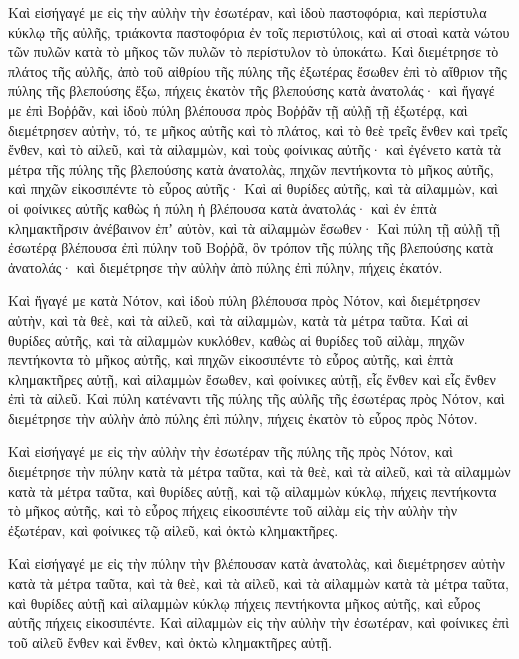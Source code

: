 {\par }{\PP {}Καὶ εἰσήγαγέ με εἰς τὴν αὐλὴν τὴν ἐσωτέραν, καὶ ἰδοὺ παστοφόρια, καὶ περίστυλα κύκλῳ τῆς αὐλῆς, τριάκοντα παστοφόρια ἐν τοῖς περιστύλοις,
καὶ αἱ στοαὶ κατὰ νώτου τῶν πυλῶν κατὰ τὸ μῆκος τῶν πυλῶν τὸ περίστυλον τὸ ὑποκάτω.
Καὶ διεμέτρησε τὸ πλάτος τῆς αὐλῆς, ἀπὸ τοῦ αἰθρίου τῆς πύλης τῆς ἐξωτέρας ἔσωθεν ἐπὶ τὸ αἴθριον τῆς πύλης τῆς βλεπούσης ἔξω, πήχεις ἑκατὸν τῆς βλεπούσης κατὰ ἀνατολάς· καὶ ἤγαγέ με ἐπὶ Βοῤῥᾶν,
καὶ ἰδοὺ πύλη βλέπουσα πρὸς Βοῤῥᾶν τῇ αὐλῇ τῇ ἐξωτέρᾳ, καὶ διεμέτρησεν αὐτὴν, τό, τε μῆκος αὐτῆς καὶ τὸ πλάτος,
καὶ τὸ θεὲ τρεῖς ἔνθεν καὶ τρεῖς ἔνθεν, καὶ τὸ αἰλεῦ, καὶ τὰ αἰλαμμὼν, καὶ τοὺς φοίνικας αὐτῆς· καὶ ἐγένετο κατὰ τὰ μέτρα τῆς πύλης τῆς βλεπούσης κατὰ ἀνατολὰς, πηχῶν πεντήκοντα τὸ μῆκος αὐτῆς, καὶ πηχῶν εἰκοσιπέντε τὸ εὖρος αὐτῆς·
Καὶ αἱ θυρίδες αὐτῆς, καὶ τὰ αἰλαμμὼν, καὶ οἱ φοίνικες αὐτῆς καθὼς ἡ πύλη ἡ βλέπουσα κατὰ ἀνατολάς· καὶ ἐν ἑπτὰ κλημακτῆρσιν ἀνέβαινον ἐπʼ αὐτὸν, καὶ τὰ αἰλαμμὼν ἔσωθεν·
Καὶ πύλη τῇ αὐλῇ τῇ ἐσωτέρᾳ βλέπουσα ἐπὶ πύλην τοῦ Βοῤῥᾶ, ὃν τρόπον τῆς πύλης τῆς βλεπούσης κατὰ ἀνατολάς· καὶ διεμέτρησε τὴν αὐλὴν ἀπὸ πύλης ἐπὶ πύλην, πήχεις ἑκατόν.
\par }{\PP {}Καὶ ἤγαγέ με κατὰ Νότον, καὶ ἰδοὺ πύλη βλέπουσα πρὸς Νότον, καὶ διεμέτρησεν αὐτὴν, καὶ τὰ θεὲ, καὶ τὰ αἰλεῦ, καὶ τὰ αἰλαμμὼν, κατὰ τὰ μέτρα ταῦτα.
Καὶ αἱ θυρίδες αὐτῆς, καὶ τὰ αἰλαμμὼν κυκλόθεν, καθὼς αἱ θυρίδες τοῦ αἰλὰμ, πηχῶν πεντήκοντα τὸ μῆκος αὐτῆς, καὶ πηχῶν εἰκοσιπέντε τὸ εὖρος αὐτῆς,
καὶ ἑπτὰ κλημακτῆρες αὐτῇ, καὶ αἰλαμμὼν ἔσωθεν, καὶ φοίνικες αὐτῇ, εἷς ἔνθεν καὶ εἷς ἔνθεν ἐπὶ τὰ αἰλεῦ.
Καὶ πύλη κατέναντι τῆς πύλης τῆς αὐλῆς τῆς ἐσωτέρας πρὸς Νότον, καὶ διεμέτρησε τὴν αὐλὴν ἀπὸ πύλης ἐπὶ πύλην, πήχεις ἑκατὸν τὸ εὖρος πρὸς Νότον.
\par }{\PP {}Καὶ εἰσήγαγέ με εἰς τὴν αὐλὴν τὴν ἐσωτέραν τῆς πύλης τῆς πρὸς Νότον, καὶ διεμέτρησε τὴν πύλην κατὰ τὰ μέτρα ταῦτα,
καὶ τὰ θεὲ, καὶ τὰ αἰλεῦ, καὶ τὰ αἰλαμμὼν κατὰ τὰ μέτρα ταῦτα, καὶ θυρίδες αὐτῇ, καὶ τῷ αἰλαμμὼν κύκλῳ, πήχεις πεντήκοντα τὸ μῆκος αὐτῆς,
καὶ τὸ εὖρος πήχεις εἰκοσιπέντε τοῦ αἰλὰμ εἰς τὴν αὐλὴν τὴν ἐξωτέραν, καὶ φοίνικες τῷ αἰλεῦ, καὶ ὀκτὼ κλημακτῆρες.
\par }{\PP {}Καὶ εἰσήγαγέ με εἰς τὴν πύλην τὴν βλέπουσαν κατὰ ἀνατολὰς, καὶ διεμέτρησεν αὐτὴν κατὰ τὰ μέτρα ταῦτα,
καὶ τὰ θεὲ, καὶ τὰ αἰλεῦ, καὶ τὰ αἰλαμμὼν κατὰ τὰ μέτρα ταῦτα, καὶ θυρίδες αὐτῇ καὶ αἰλαμμὼν κύκλῳ πήχεις πεντήκοντα μῆκος αὐτῆς, καὶ εὖρος αὐτῆς πήχεις εἰκοσιπέντε.
Καὶ αἰλαμμὼν εἰς τὴν αὐλὴν τὴν ἐσωτέραν, καὶ φοίνικες ἐπὶ τοῦ αἰλεῦ ἔνθεν καὶ ἔνθεν, καὶ ὀκτὼ κλημακτῆρες αὐτῇ.
}
